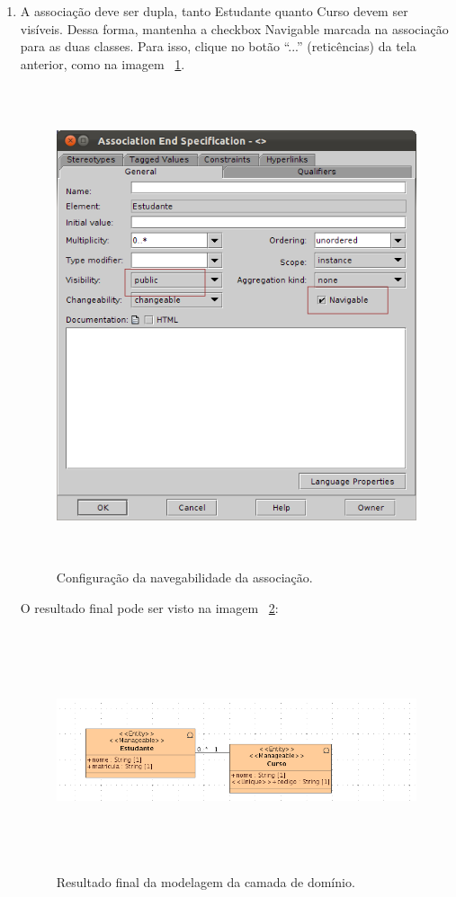 \begin{enumerate}
\item A associação deve ser dupla, tanto Estudante quanto Curso devem ser
visíveis. Dessa forma, mantenha a checkbox Navigable marcada na associação para
as duas classes. Para isso, clique no botão “...” (reticências) da tela
anterior, como na imagem ~\ref{config_navigable_associacao}.
\begin{figure}[!htb]
	\centering
	\includegraphics[width=350pt,height=400pt]{imgs/tutorial-mdarte-0006.png}
	\caption{Configuração da navegabilidade da associação.}
	\label{config_navigable_associacao}
\end{figure}
		
O resultado final pode ser visto na imagem ~\ref{resultado_diagrama_classe}: \hfill
\begin{figure}[!htb]
	\centering
	\includegraphics[width=500pt,height=200pt]{imgs/tutorial-mdarte-0007.png}
	\caption{Resultado final da modelagem da camada de domínio.}
	\label{resultado_diagrama_classe}
\end{figure}
	

\end{enumerate}
